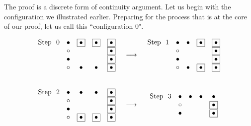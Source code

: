 \documentclass{article}
\begin{document}
The proof is a discrete form of continuity argument.  Let us begin with the configuration we illustrated earlier.  Preparing for the process that is at the core of our proof, let us call this ``configuration $0$".

\begin{figure}[htb]
\small
\[
\begin{array}{ccc}
\begin{array}{rcccc}
\mbox{Step } \ 0 &
\bullet & \fbox{$\bullet$} & \fbox{$\bullet$} & \fbox{$\bullet$}  \\
& \circ   &                      &                      & \fbox{$\bullet$}  \\
& \bullet &                      &                      & \fbox{$\bullet$}  \\
& \circ    &  \bullet          &   \bullet         & \fbox{$\bullet$}
\end{array}
 & \longrightarrow &
\begin{array}{rcccc}
\mbox{Step } \ 1 &
\bullet & \bullet          & \fbox{$\bullet$} & \fbox{$\bullet$}  \\
& \circ   &                      &                      & \fbox{$\bullet$}  \\
& \bullet &                      &                      & \fbox{$\bullet$}  \\
& \circ    &  \bullet           & \fbox{$\bullet$} & \fbox{$\bullet$}
\end{array}
 \\  \\ \\
\begin{array}{rcccc}
\mbox{Step } \ 2 &
\bullet & \bullet          &      \bullet     & \fbox{$\bullet$} \\
& \circ   &                      &                      & \fbox{$\bullet$}  \\
& \bullet &                      &                      & \fbox{$\bullet$}  \\
& \circ   & \fbox{$\bullet$} & \fbox{$\bullet$} & \fbox{$\bullet$}
\end{array}
 & \longrightarrow &
\begin{array}{rcccc}
\mbox{Step } \  3 &
\bullet & \bullet                 &            \bullet & \bullet  \\
& \circ    &                            &                      & \fbox{$\bullet$}  \\
& \bullet &                            &                      & \fbox{$\bullet$}  \\

\end{array}
\end{array}\]
\end{figure}
\end{document}
